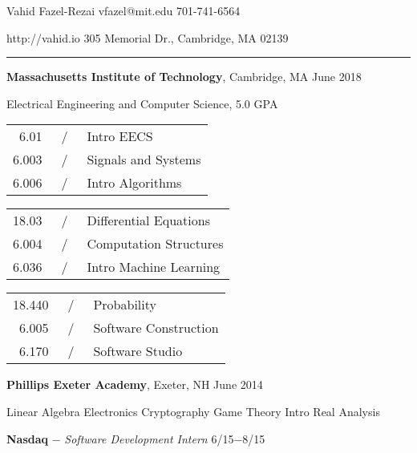 \documentclass[11pt]{article}
\newcommand{\msection}[1]{\vspace{1em}\marginnote{#1}} %
\newcommand{\bt}[1]{\textbf{#1}} %
\newcommand{\gap}[0]{\vspace{0.5em}} %
\newcommand{\dash}[0]{ $-$ } %
\newcommand{\tabsep}[0]{\, / \,} %
\begin{document}

{\huge Vahid Fazel-Rezai} \hfill vfazel@mit.edu \hspace{4.5em} 701-741-6564

\vspace{0.5em}

http://vahid.io \hfill 305 Memorial Dr., Cambridge, MA 02139

\vspace{0.2em}

\hspace{-1.2in}\rule{7.9in}{0.2em}

\vspace{-0.4em}



\msection{Education}

\bt{Massachusetts Institute of Technology}, Cambridge, MA \hfill June 2018

Electrical Engineering and Computer Science, 5.0 GPA
\vspace{0.15em}

\begin{tabular}{rcl}
6.01 & \tabsep & Intro EECS \\
6.003 & \tabsep & Signals and Systems \\
6.006 & \tabsep & Intro Algorithms
\end{tabular}
\hfill
\begin{tabular}{rcl}
18.03 & \tabsep & Differential Equations \\
6.004 & \tabsep & Computation Structures \\
6.036 & \tabsep & Intro Machine Learning
\end{tabular}
\hfill
\begin{tabular}{rcl}
18.440 & \tabsep & Probability \\
6.005 & \tabsep & Software Construction \\
6.170 & \tabsep & Software Studio
\end{tabular}

\gap

\bt{Phillips Exeter Academy}, Exeter, NH \hfill June 2014

Linear Algebra
\hfill
Electronics
\hfill
Cryptography
\hfill
Game Theory
\hfill
Intro Real Analysis



\msection{Work}

\bt{Nasdaq}\dash \emph{Software Development Intern} \hfill 6/15$-$8/15
\end{document}
